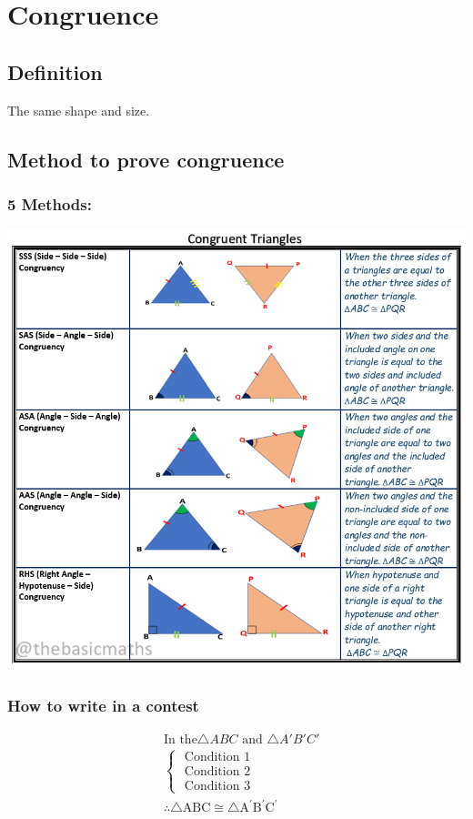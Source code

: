 \documentclass{article}
\begin{document}
\section{Congruence}
\subsection{Definition}
The same shape and size.
\subsection{Method to prove congruence}
\subsubsection{5 Methods:}
\includegraphics[scale=.5]{congruent-triangles.png}
\subsubsection{How to write in a contest}

$$
\begin{aligned}
& \text{In the} \triangle ABC \text{ and } \triangle A'B'C'\\
& \left\{\begin{array}{l}
\text { Condition } 1 \\
\text { Condition } 2 \\
\text { Condition } 3
\end{array}\right. \\
& \therefore \triangle \mathrm{ABC} \cong \triangle \mathrm{A}^{\prime} \mathrm{B}^{\prime} \mathrm{C}^{\prime}
\end{aligned}
$$
\end{document}
